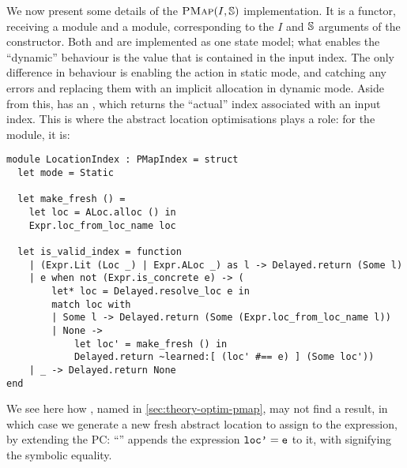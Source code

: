 We now present some details of the $\textsc{PMap}(I,\mathbb S)$ implementation. It is a functor, receiving a  module and a  module, corresponding to the $I$ and $\mathbb S$ arguments of the constructor. Both \PMap{} and \DynPMap{} are implemented as one state model; what enables the ``dynamic'' behaviour is the value  that is contained in the input index. The only difference in behaviour is enabling the \alloc{} action in static mode, and catching any  errors and replacing them with an implicit allocation in dynamic mode. Aside from this,  has an , which returns the ``actual'' index associated with an input index. This is where the abstract location optimisations plays a role: for the  module, it is: \begin{lstlisting}
module LocationIndex : PMapIndex = struct
  let mode = Static

  let make_fresh () =
    let loc = ALoc.alloc () in
    Expr.loc_from_loc_name loc
    
  let is_valid_index = function
    | (Expr.Lit (Loc _) | Expr.ALoc _) as l -> Delayed.return (Some l)
    | e when not (Expr.is_concrete e) -> (
        let* loc = Delayed.resolve_loc e in
        match loc with
        | Some l -> Delayed.return (Some (Expr.loc_from_loc_name l))
        | None ->
            let loc' = make_fresh () in
            Delayed.return ~learned:[ (loc' #== e) ] (Some loc'))
    | _ -> Delayed.return None
end
\end{lstlisting}
We see here how , named  in \cref{sec:theory-optim-pmap}, may not find a result, in which case we generate a new fresh abstract location to assign to the expression, by extending the PC: ``'' appends the expression $\texttt{loc'} = \texttt{e}$ to it, with \code{\#==} signifying the symbolic equality.

